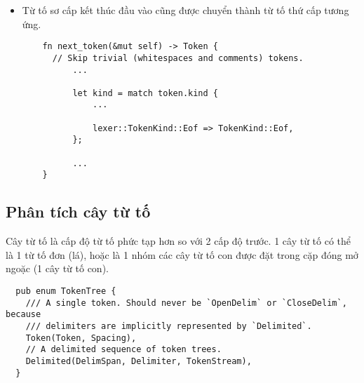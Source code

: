 \begin{itemize}
\begin{lstlisting}
          ...
    }
  \end{lstlisting}
  \item Từ tố sơ cấp kết thúc đầu vào cũng được chuyển thành từ tố thứ cấp tương ứng.
  \begin{lstlisting}
    fn next_token(&mut self) -> Token {
      // Skip trivial (whitespaces and comments) tokens.
          ...
  
          let kind = match token.kind {
              ...    
  
              lexer::TokenKind::Eof => TokenKind::Eof,
          };
  
          ...
    }
  \end{lstlisting}
\end{itemize}

\subsection{Phân tích cây từ tố}
Cây từ tố là cấp độ từ tố phức tạp hơn so với 2 cấp độ trước. 1 cây từ tố có thể là 1 từ tố đơn (lá), hoặc là 1 nhóm các cây từ tố con được đặt trong cặp đóng mở ngoặc (1 cây từ tố con).

\begin{lstlisting}
  pub enum TokenTree {
    /// A single token. Should never be `OpenDelim` or `CloseDelim`, because
    /// delimiters are implicitly represented by `Delimited`.
    Token(Token, Spacing),
    // A delimited sequence of token trees.
    Delimited(DelimSpan, Delimiter, TokenStream),
  }
\end{lstlisting}


